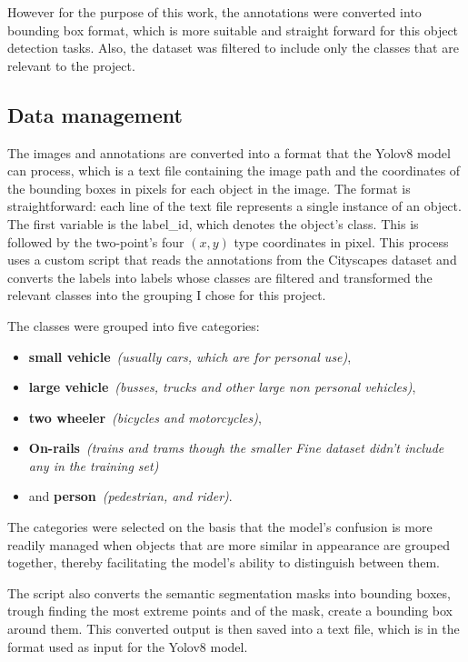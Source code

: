 However for the purpose of this work, the annotations were converted into bounding box format,
which is more suitable and straight forward for this object detection tasks.
Also, the dataset was filtered to include only the classes that are relevant to the project.

\subsection{Data management} \label{subsec:data-management}
The images and annotations are converted into a format that the Yolov8 model can process, which is
a text file containing the image path and the coordinates of the bounding boxes in pixels for each object in the image.
The format is straightforward: each line of the text file represents a single instance of an object.
The first variable is the label\_id, which denotes the object's class.
This is followed by the two-point's four \((x, y)\) type coordinates in pixel.
This process uses a custom script that reads the annotations from the Cityscapes dataset and converts the labels
into labels whose classes are filtered and transformed the relevant classes into the grouping I chose for this project.

The classes were grouped into five categories:
\begin{itemize}
    \item \textbf{small vehicle}~\textit{(usually cars, which are for personal use)},
    \item \textbf{large vehicle}~\textit{(busses, trucks and other large non personal vehicles)},
    \item \textbf{two wheeler}~\textit{(bicycles and motorcycles)},
    \item \textbf{On-rails}~\textit{(trains and trams though the smaller Fine dataset didn't include any in the training set)}
    \item and \textbf{person}~\textit{(pedestrian, and rider)}.
\end{itemize}

The categories were selected on the basis that the model's confusion is more readily managed when objects
that are more similar in appearance are grouped together, thereby facilitating the model's ability to
distinguish between them.

The script also converts the semantic segmentation masks into bounding boxes, trough finding the most
extreme points and of the mask, create a bounding box around them.
This converted output is then saved into a text file, which is in the format used as input for the Yolov8 model.

